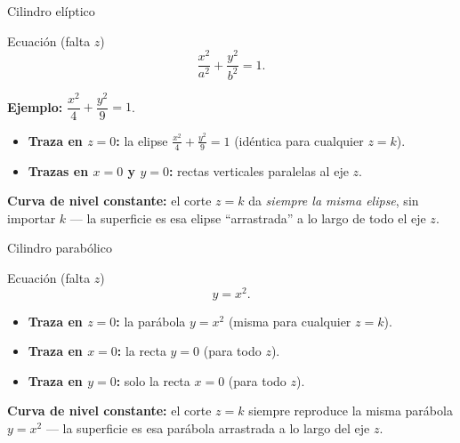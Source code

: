 \documentclass[11pt,aspectratio=169]{beamer}
\begin{document}
\begin{frame}{Cilindro elíptico}
  \begin{block}{Ecuación (falta $z$)}
    \[
      \frac{x^2}{a^2}+\frac{y^2}{b^2}=1.
    \]
  \end{block}
  \pause
  \textbf{Ejemplo:} $\dfrac{x^2}{4}+\dfrac{y^2}{9}=1$.
  \pause
  \begin{itemize}
    \item \textbf{Traza en $z=0$:} la elipse $\frac{x^2}{4}+\frac{y^2}{9}=1$ (idéntica para cualquier $z=k$).
    \pause
    \item \textbf{Trazas en $x=0$ y $y=0$:} rectas verticales paralelas al eje $z$.
  \end{itemize}
  \pause
  \begin{center}\normalsize\color{tealx}
  \textbf{Curva de nivel constante:} el corte $z=k$ da \emph{siempre la misma elipse}, sin importar $k$ --- la superficie es esa elipse ``arrastrada'' a lo largo de todo el eje $z$.
  \end{center}
\end{frame}

\begin{frame}{Cilindro parabólico}
  \begin{block}{Ecuación (falta $z$)}
    \[
      y=x^2.
    \]
  \end{block}
  \pause
  \begin{itemize}
    \item \textbf{Traza en $z=0$:} la parábola $y=x^2$ (misma para cualquier $z=k$).
    \pause
    \item \textbf{Traza en $x=0$:} la recta $y=0$ (para todo $z$).
    \pause
    \item \textbf{Traza en $y=0$:} solo la recta $x=0$ (para todo $z$).
  \end{itemize}
  \pause
  \begin{center}\normalsize\color{tealx}
  \textbf{Curva de nivel constante:} el corte $z=k$ siempre reproduce la misma parábola $y=x^2$ --- la superficie es esa parábola arrastrada a lo largo del eje $z$.
  \end{center}
\end{frame}
\end{document}
